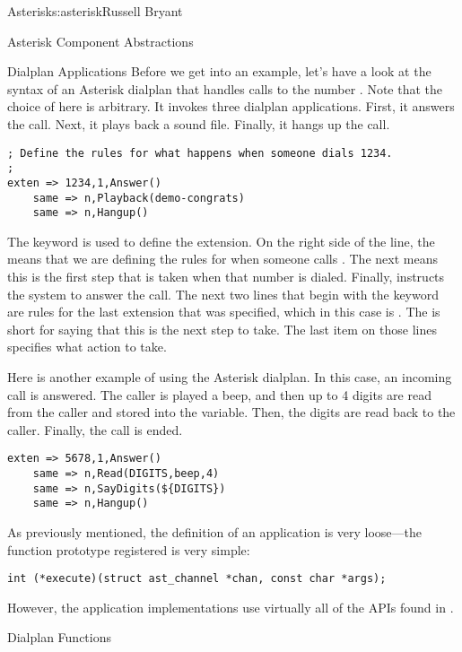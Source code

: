 \begin{aosachapter}{Asterisk}{s:asterisk}{Russell Bryant}
\begin{aosasect1}{Asterisk Component Abstractions}
\begin{aosasect2}{Dialplan Applications}
Before we get into an example, let's have a look at the syntax of an
Asterisk dialplan that handles calls to the number . Note
that the choice of  here is arbitrary. It invokes three
dialplan applications. First, it answers the call. Next, it plays back
a sound file. Finally, it hangs up the call.

\begin{verbatim}
; Define the rules for what happens when someone dials 1234.
;
exten => 1234,1,Answer()
    same => n,Playback(demo-congrats)
    same => n,Hangup()
\end{verbatim}

\noindent The  keyword is used to define the extension.  On the
right side of the  line, the  means that we are
defining the rules for when someone calls .  The next
 means this is the first step that is taken when that number
is dialed. Finally,  instructs the system to answer the
call.  The next two lines that begin with the  keyword are
rules for the last extension that was specified, which in this case is
.  The  is short for saying that this is the next
step to take.  The last item on those lines specifies what action to
take.

Here is another example of using the Asterisk dialplan. In this case,
an incoming call is answered. The caller is played a beep, and then up
to 4 digits are read from the caller and stored into the 
variable. Then, the digits are read back to the caller. Finally, the
call is ended.

\begin{verbatim}
exten => 5678,1,Answer()
    same => n,Read(DIGITS,beep,4)
    same => n,SayDigits(${DIGITS})
    same => n,Hangup()
\end{verbatim}

As previously mentioned, the definition of an application is very
loose---the function prototype registered is very simple:

\begin{verbatim}
int (*execute)(struct ast_channel *chan, const char *args);
\end{verbatim}

\noindent
However, the application implementations use virtually all of the
APIs found in .

\end{aosasect2}

\begin{aosasect2}{Dialplan Functions}


\end{aosasect2}
\end{aosasect1}
\end{aosachapter}
